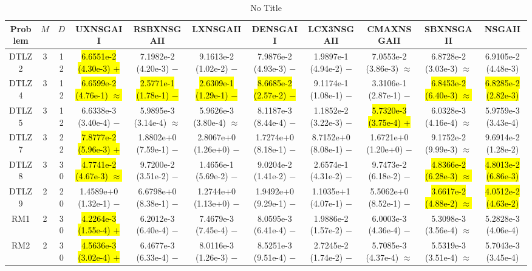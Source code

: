 \documentclass[journal]{IEEEtran}
\begin{document}
\begin{table*}[htbp]
\renewcommand{\arraystretch}{1.2}
\centering
\caption{No Title}
\begin{tabular}{ccccccccccc}
\toprule
Problem&$M$&$D$&UXNSGAII&RSBXNSGAII&LXNSGAII&DENSGAII&LCX3NSGAII&CMAXNSGAII&SBXNSGAII&NSGAII\\
\midrule
\multirow{1}{*}{DTLZ2}&3&12&\hl{6.6551e-2 (4.30e-3) $+$}&7.1982e-2 (4.20e-3) $-$&9.1613e-2 (1.02e-2) $-$&7.9876e-2 (4.93e-3) $-$&1.9897e-1 (4.94e-2) $-$&7.0553e-2 (3.86e-3) $\approx$&6.8728e-2 (3.03e-3) $\approx$&6.9105e-2 (4.48e-3)\\
\hline
\multirow{1}{*}{DTLZ4}&3&12&\hl{6.6599e-2 (4.76e-1) $\approx$}&\hl{2.5771e-1 (1.78e-1) $-$}&\hl{2.6309e-1 (1.29e-1) $-$}&\hl{8.6685e-2 (2.57e-2) $-$}&9.1174e-1 (1.08e-1) $-$&3.3106e-1 (2.87e-1) $-$&\hl{6.8453e-2 (6.40e-3) $\approx$}&\hl{6.8285e-2 (2.82e-3)}\\
\hline
\multirow{1}{*}{DTLZ5}&3&12&6.6338e-3 (3.40e-4) $-$&5.9895e-3 (3.14e-4) $\approx$&5.9626e-3 (3.80e-4) $\approx$&8.1187e-3 (8.44e-4) $-$&1.1852e-2 (3.22e-3) $-$&\hl{5.7320e-3 (3.75e-4) $+$}&6.0328e-3 (4.16e-4) $\approx$&5.9759e-3 (3.43e-4)\\
\hline
\multirow{1}{*}{DTLZ7}&3&22&\hl{7.8777e-2 (5.96e-3) $+$}&1.8802e+0 (7.59e-1) $-$&2.8067e+0 (1.26e+0) $-$&1.7274e+0 (8.18e-1) $-$&8.7152e+0 (8.08e-1) $-$&1.6721e+0 (1.20e+0) $-$&9.1752e-2 (9.99e-3) $\approx$&9.6914e-2 (1.28e-2)\\
\hline
\multirow{1}{*}{DTLZ8}&3&30&\hl{4.7741e-2 (4.67e-3) $\approx$}&9.7200e-2 (3.51e-2) $-$&1.4656e-1 (5.69e-2) $-$&9.0204e-2 (1.41e-2) $-$&2.6574e-1 (4.31e-2) $-$&9.7473e-2 (6.18e-2) $-$&\hl{4.8366e-2 (6.28e-3) $\approx$}&\hl{4.8013e-2 (6.86e-3)}\\
\hline
\multirow{1}{*}{DTLZ9}&2&20&1.4589e+0 (1.32e-1) $-$&6.6798e+0 (8.38e-1) $-$&1.2744e+0 (1.13e+0) $-$&1.9492e+0 (9.29e-1) $-$&1.1035e+1 (4.07e-1) $-$&5.5062e+0 (8.52e-1) $-$&\hl{3.6617e-2 (4.88e-2) $\approx$}&\hl{4.0512e-2 (4.63e-2)}\\
\hline
\multirow{1}{*}{RM1}&2&30&\hl{4.2264e-3 (1.55e-4) $+$}&6.2012e-3 (6.40e-4) $-$&7.4679e-3 (7.45e-4) $-$&8.0595e-3 (6.41e-4) $-$&1.9886e-2 (1.57e-2) $-$&6.0003e-3 (4.36e-4) $-$&5.3098e-3 (3.56e-4) $\approx$&5.2828e-3 (4.06e-4)\\
\hline
\multirow{1}{*}{RM2}&2&30&\hl{4.5636e-3 (3.02e-4) $+$}&6.4677e-3 (6.33e-4) $-$&8.0116e-3 (1.26e-3) $-$&8.5251e-3 (9.51e-4) $-$&2.7245e-2 (1.74e-2) $-$&5.7085e-3 (4.37e-4) $\approx$&5.5319e-3 (3.51e-4) $\approx$&5.7043e-3 (3.45e-4)\\

\end{tabular}
\end{table*}
\end{document}
